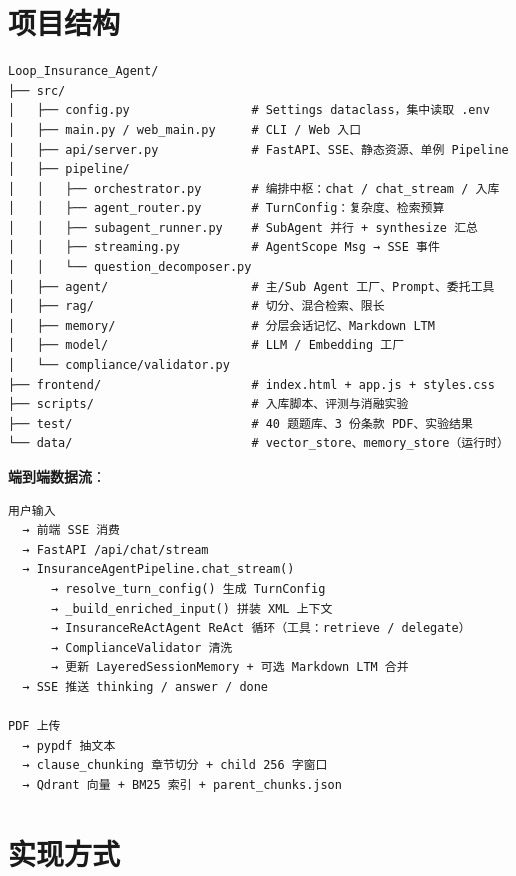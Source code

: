 \documentclass[11pt,a4paper]{ctexart}
\begin{document}
\section{项目结构}

\begin{lstlisting}
Loop_Insurance_Agent/
├── src/
│   ├── config.py                 # Settings dataclass，集中读取 .env
│   ├── main.py / web_main.py     # CLI / Web 入口
│   ├── api/server.py             # FastAPI、SSE、静态资源、单例 Pipeline
│   ├── pipeline/
│   │   ├── orchestrator.py       # 编排中枢：chat / chat_stream / 入库
│   │   ├── agent_router.py       # TurnConfig：复杂度、检索预算
│   │   ├── subagent_runner.py    # SubAgent 并行 + synthesize 汇总
│   │   ├── streaming.py          # AgentScope Msg → SSE 事件
│   │   └── question_decomposer.py
│   ├── agent/                    # 主/Sub Agent 工厂、Prompt、委托工具
│   ├── rag/                      # 切分、混合检索、限长
│   ├── memory/                   # 分层会话记忆、Markdown LTM
│   ├── model/                    # LLM / Embedding 工厂
│   └── compliance/validator.py
├── frontend/                     # index.html + app.js + styles.css
├── scripts/                      # 入库脚本、评测与消融实验
├── test/                         # 40 题题库、3 份条款 PDF、实验结果
└── data/                         # vector_store、memory_store（运行时）
\end{lstlisting}

\textbf{端到端数据流}：

\begin{lstlisting}
用户输入
  → 前端 SSE 消费
  → FastAPI /api/chat/stream
  → InsuranceAgentPipeline.chat_stream()
      → resolve_turn_config() 生成 TurnConfig
      → _build_enriched_input() 拼装 XML 上下文
      → InsuranceReActAgent ReAct 循环（工具：retrieve / delegate）
      → ComplianceValidator 清洗
      → 更新 LayeredSessionMemory + 可选 Markdown LTM 合并
  → SSE 推送 thinking / answer / done

PDF 上传
  → pypdf 抽文本
  → clause_chunking 章节切分 + child 256 字窗口
  → Qdrant 向量 + BM25 索引 + parent_chunks.json
\end{lstlisting}

\section{实现方式}
\end{document}
